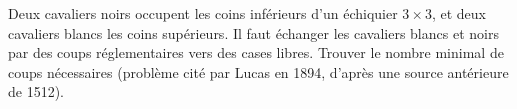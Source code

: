 Deux cavaliers noirs occupent les coins inférieurs d'un échiquier $3 \times 3$, et deux cavaliers blancs les coins supérieurs. Il faut échanger les cavaliers blancs et noirs par des coups réglementaires vers des cases libres. Trouver le nombre minimal de coups nécessaires (problème cité par Lucas en 1894, d'après une source antérieure de 1512).
